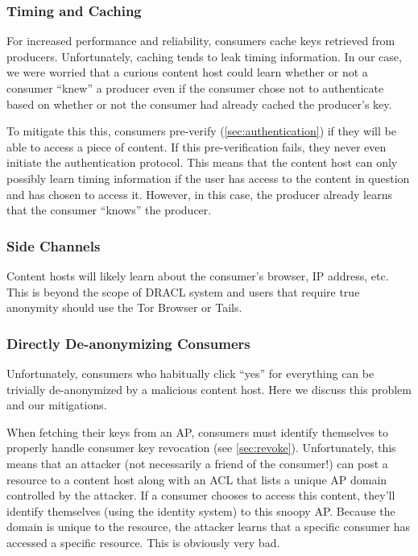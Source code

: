 \documentclass[pdftex,12pt,a4papaer,twoside,notitlepage]{report}
\begin{document}
\subsubsection{Timing and Caching}
\label{sec:timing}

For increased performance and reliability, consumers cache keys retrieved from
producers. Unfortunately, caching tends to leak timing information. In our
case, we were worried that a curious content host could learn whether or not a
consumer ``knew'' a producer even if the consumer chose not to authenticate
based on whether or not the consumer had already cached the producer's key.

To mitigate this this, consumers pre-verify (\cref{sec:authentication}) if they
will be able to access a piece of content. If this pre-verification fails, they
never even initiate the authentication protocol. This means that the content
host can only possibly learn timing information if the user has access to the
content in question and has chosen to access it. However, in this case, the
producer already learns that the consumer ``knows'' the producer.

\subsubsection{Side Channels}

Content hosts will likely learn about the consumer's browser, IP address, etc.
This is beyond the scope of DRACL system and users that require true anonymity
should use the Tor Browser\cite{tor} or Tails\cite{tails}.

\subsubsection{Directly De-anonymizing Consumers}
\label{sec:doxing_consumers}

Unfortunately, consumers who habitually click ``yes'' for everything can be
trivially de-anonymized by a malicious content host. Here we discuss this
problem and our mitigations.

When fetching their keys from an AP, consumers must identify themselves to
properly handle consumer key revocation (see \cref{sec:revoke}). Unfortunately,
this means that an attacker (not necessarily a friend of the consumer!) can post
a resource to a content host along with an ACL that lists a unique AP domain
controlled by the attacker. If a consumer chooses to access this content,
they'll identify themselves (using the identity system) to this snoopy AP.
Because the domain is unique to the resource, the attacker learns that a
specific consumer has accessed a specific resource. This is obviously very bad.
\end{document}
